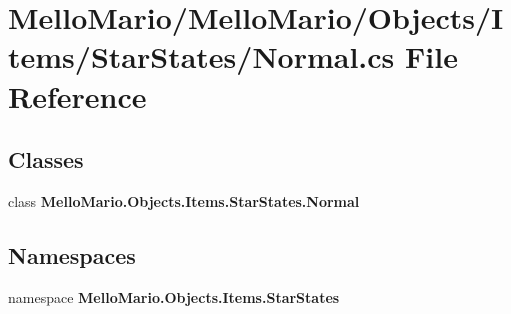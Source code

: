 \section{Mello\+Mario/\+Mello\+Mario/\+Objects/\+Items/\+Star\+States/\+Normal.cs File Reference}
\label{Items_2StarStates_2Normal_8cs}
\subsection*{Classes}
\begin{DoxyCompactItemize}
\item 
class \textbf{ Mello\+Mario.\+Objects.\+Items.\+Star\+States.\+Normal}
\end{DoxyCompactItemize}
\subsection*{Namespaces}
\begin{DoxyCompactItemize}
\item 
namespace \textbf{ Mello\+Mario.\+Objects.\+Items.\+Star\+States}
\end{DoxyCompactItemize}
